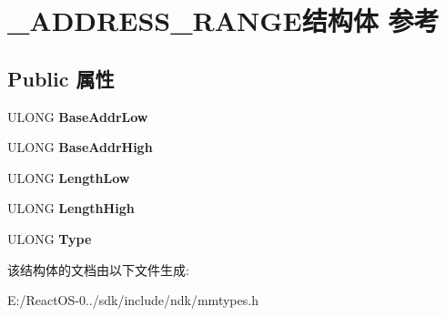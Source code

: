 \hypertarget{struct___a_d_d_r_e_s_s___r_a_n_g_e}{}\section{\+\_\+\+A\+D\+D\+R\+E\+S\+S\+\_\+\+R\+A\+N\+G\+E结构体 参考}
\label{struct___a_d_d_r_e_s_s___r_a_n_g_e}
\subsection*{Public 属性}
\begin{DoxyCompactItemize}
\item 
\mbox{\label{struct___a_d_d_r_e_s_s___r_a_n_g_e_ad875c25de2d1752c3ec83becebe693c2}} 
U\+L\+O\+NG {\bfseries Base\+Addr\+Low}
\item 
\mbox{\label{struct___a_d_d_r_e_s_s___r_a_n_g_e_a7c04bf7c7cb773e87fdb695054596ca4}} 
U\+L\+O\+NG {\bfseries Base\+Addr\+High}
\item 
\mbox{\label{struct___a_d_d_r_e_s_s___r_a_n_g_e_ac59bbec45945b5d669812780c1d74933}} 
U\+L\+O\+NG {\bfseries Length\+Low}
\item 
\mbox{\label{struct___a_d_d_r_e_s_s___r_a_n_g_e_a5b885b7c1f656892503d2e5861c33ab4}} 
U\+L\+O\+NG {\bfseries Length\+High}
\item 
\mbox{\label{struct___a_d_d_r_e_s_s___r_a_n_g_e_a374ee48feda398757ba2ba8582fc7ea7}} 
U\+L\+O\+NG {\bfseries Type}
\end{DoxyCompactItemize}


该结构体的文档由以下文件生成\+:\begin{DoxyCompactItemize}
\item 
E\+:/\+React\+O\+S-\/0../sdk/include/ndk/mmtypes.\+h\end{DoxyCompactItemize}
